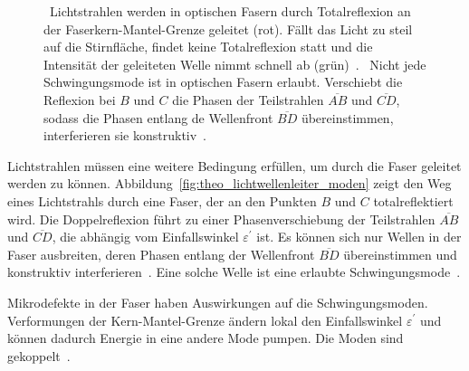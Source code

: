 \documentclass[a4paper,12pt,twoside,parskip=no,headsepline,open=right,ngerman,export]{scrreprt}
\begin{document}
            \begin{figure}[!b]
                \centering
                \caption[Lichtleitung in optischen Fasern]{~Lichtstrahlen werden in optischen Fasern durch Totalreflexion an der Faserkern-Mantel-Grenze geleitet (rot). Fällt das Licht zu steil auf die Stirnfläche, findet keine Totalreflexion statt und die Intensität der geleiteten Welle nimmt schnell ab (grün)~\cite{pedrotti_optik_2005}. ~Nicht jede Schwingungsmode ist in optischen Fasern erlaubt. Verschiebt die Reflexion bei $B$ und $C$ die Phasen der Teilstrahlen $\overline{AB}$ und $\overline{CD}$, sodass die Phasen entlang de Wellenfront $\overline{BD}$ übereinstimmen, interferieren sie konstruktiv~\cite{pedrotti_optik_2005}.}
            \end{figure}
            
            Lichtstrahlen müssen eine weitere Bedingung erfüllen, um durch die Faser geleitet werden zu können. Abbildung~\ref{fig:theo_lichtwellenleiter_moden} zeigt den Weg eines Lichtstrahls durch eine Faser, der an den Punkten $B$ und $C$ totalreflektiert wird. Die Doppelreflexion führt zu einer Phasenverschiebung der Teilstrahlen $\overline{AB}$ und $\overline{CD}$, die abhängig vom Einfallswinkel $\varepsilon^\prime$ ist. Es können sich nur Wellen in der Faser ausbreiten, deren Phasen entlang der Wellenfront $\overline{BD}$ übereinstimmen und konstruktiv interferieren~\cite{pedrotti_optik_2005}. Eine solche Welle ist eine erlaubte Schwingungsmode~\cite{pedrotti_optik_2005}.
            
            Mikrodefekte in der Faser haben Auswirkungen auf die Schwingungsmoden. Verformungen der Kern-Mantel-Grenze ändern lokal den Einfallswinkel $\varepsilon^\prime$ und können dadurch Energie in eine andere Mode pumpen. Die Moden sind gekoppelt~\cite{pedrotti_optik_2005}.
            
\end{document}
